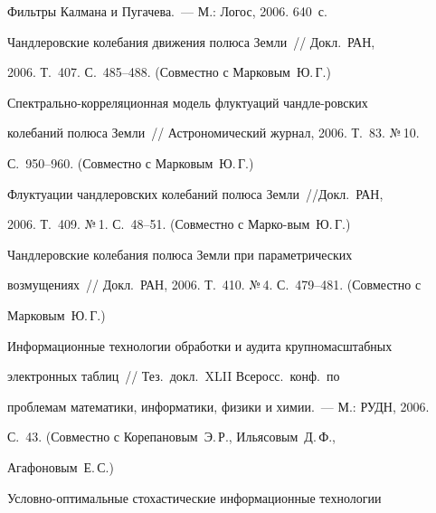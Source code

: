 \vspace*{-6pt}










 Фильтры Калмана и Пугачева.~--- М.: Логос, 2006. 640~с.





 Чандлеровские колебания движения полюса Земли~// Докл.\ РАН,


2006. Т.~407. С.~485--488. (Совместно с Марковым~Ю.\,Г.)





 Спектрально-корреляционная модель флуктуаций чандле-\linebreak ровских


колебаний полюса Земли~// Астрономический журнал, 2006. Т.~83. №\,10.


С.~950--960. (Совместно с Марковым~Ю.\,Г.)


\pagebreak





 Флуктуации чандлеровских колебаний полюса Земли~//\linebreak Докл.\ РАН,


2006. Т.~409. №\,1. С.~48--51. (Совместно с Марко-\linebreak вым~Ю.\,Г.)





 Чандлеровские колебания полюса Земли при параметрических


возмущениях~// Докл.\ РАН, 2006. Т.~410. №\,4. С.~479--481. (Совместно с


Марковым~Ю.\,Г.)





 Информационные технологии обработки и аудита крупномасштабных


электронных таблиц~// Тез.\ докл.\ XLII Всеросс.\ конф.\ по


проблемам математики, информатики, физики и химии.~--- М.: РУДН, 2006.


С.~43. (Совместно с Корепановым~Э.\,Р., Ильясовым~Д.\,Ф.,


Агафоновым~Е.\,С.)





 Условно-оптимальные стохастические информационные технологии


